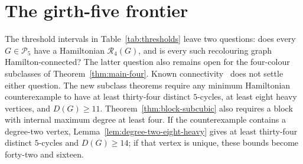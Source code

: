 \documentclass[11pt]{article}
\theoremstyle{remark}
\newcommand{\R}{\mathcal R}
\numberwithin{equation}{section}
\numberwithin{table}{section}
\begin{document}
\section{The girth-five frontier}\label{sec:sharpness}

The threshold intervals in Table~\ref{tab:thresholds} leave two
questions: does every $G\in\mathcal P_5$ have a Hamiltonian
$\R_4(G)$, and is every such recolouring graph Hamilton-connected?
The latter question also remains open for the four-colour subclasses
of Theorem~\ref{thm:main-four}. Known connectivity~\cite{BBFHMP23}
does not settle either question. The new subclass theorems require
any minimum Hamiltonian counterexample to have at least thirty-four
distinct $5$-cycles, at least eight heavy vertices, and $D(G)\ge11$.
Theorem~\ref{thm:block-subcubic} also requires a block with internal
maximum degree at least four. If the counterexample contains a
degree-two vertex, Lemma~\ref{lem:degree-two-eight-heavy} gives at
least thirty-four distinct $5$-cycles and $D(G)\ge14$; if that vertex
is unique, these bounds become forty-two and sixteen.
\end{document}
